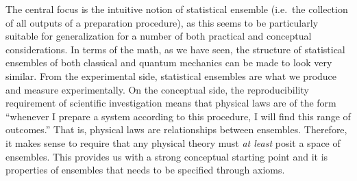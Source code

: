  

The central focus is the intuitive notion of statistical ensemble (i.e.~the collection of all outputs of a preparation procedure), as this seems to be particularly suitable for generalization for a number of both practical and conceptual considerations. In terms of the math, as we have seen, the structure of statistical ensembles of both classical and quantum mechanics can be made to look very similar. From the experimental side, statistical ensembles are what we produce and measure experimentally. On the conceptual side, the reproducibility requirement of scientific investigation means that physical laws are of the form ``whenever I prepare a system according to this procedure, I will find this range of outcomes.'' That is, physical laws are relationships between ensembles. Therefore, it makes sense to require that any physical theory must \emph{at least} posit a space of ensembles. This provides us with a strong conceptual starting point and it is properties of ensembles that needs to be specified through axioms.

